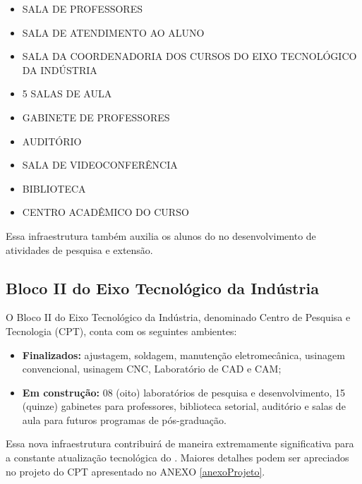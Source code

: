 \begin{itemize}
	\item SALA DE PROFESSORES
	\item SALA DE ATENDIMENTO AO ALUNO
	\item SALA DA COORDENADORIA DOS CURSOS DO EIXO TECNOLÓGICO DA INDÚSTRIA
	\item 5 SALAS DE AULA
	\item GABINETE DE PROFESSORES
	\item AUDITÓRIO
	\item SALA DE VIDEOCONFERÊNCIA
	\item BIBLIOTECA
	\item CENTRO ACADÊMICO DO CURSO
\end{itemize}

Essa infraestrutura também auxilia os alunos do \NOMECURSO no desenvolvimento de atividades de pesquisa e extensão.

\subsection{Bloco II do Eixo Tecnológico da Indústria}
O Bloco II do Eixo Tecnológico da Indústria, denominado Centro de Pesquisa e Tecnologia (CPT), conta com os seguintes ambientes:
\begin{itemize}
	\item \textbf{Finalizados:} ajustagem, soldagem, manutenção eletromecânica, usinagem convencional, usinagem CNC, Laboratório de CAD e CAM;
	\item \textbf{Em construção:} 08 (oito) laboratórios de pesquisa e desenvolvimento, 15 (quinze) gabinetes para professores, biblioteca setorial, auditório e salas de aula para futuros
	programas de pós-graduação.
\end{itemize}

Essa nova infraestrutura contribuirá de maneira extremamente significativa para a constante
atualização tecnológica do \NOMECURSO. Maiores detalhes podem ser apreciados no projeto do CPT apresentado no ANEXO \ref{anexoProjeto}.
